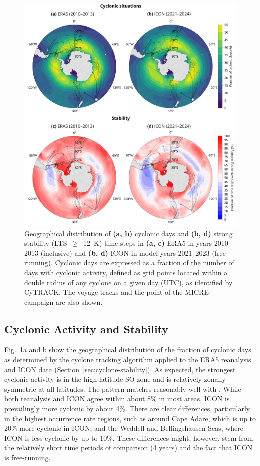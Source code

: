 \documentclass[draft]{agujournal2019}
\begin{document}
\begin{figure}[p!]
\centering
\includegraphics[width=\textwidth]{img/cyc_stab_dist_rev1.pdf}
\caption{
Geographical distribution of \textbf{(a, b)} cyclonic days and \textbf{(b, d)} strong stability (LTS~$\geq$~12~K) time steps in \textbf{(a, c)} ERA5 in years 2010--2013 (inclusive) and \textbf{(b, d)} ICON in model years 2021--2023 (free running). Cyclonic days are expressed as a fraction of the number of days with cyclonic activity, defined as grid points located within a double radius of any cyclone on a given day (UTC), as identified by CyTRACK. The voyage tracks and the point of the MICRE campaign are also shown.
}
\label{fig:cyclone-stability}
\end{figure}

\subsection{Cyclonic Activity and Stability}

Fig.~\ref{fig:cyclone-stability}a and b show the geographical distribution of the fraction of cyclonic days as determined by the cyclone tracking algorithm applied to the ERA5 reanalysis and ICON data (Section~\ref{sec:cyclone-stability}). As expected, the strongest cyclonic activity is in the high-latitude SO zone and is relatively zonally symmetric at all latitudes. The pattern matches reasonably well with . While both reanalysis and ICON agree within about 8\% in most areas, ICON is prevailingly more cyclonic by about 4\%. There are clear differences, particularly in the highest occurrence rate regions, such as around Cape Adare, which is up to 20\% more cyclonic in ICON, and the Weddell and Bellingshausen Seas, where ICON is less cyclonic by up to 10\%. These differences might, however, stem from the relatively short time periods of comparison (4 years) and the fact that ICON is free-running.
\end{document}
